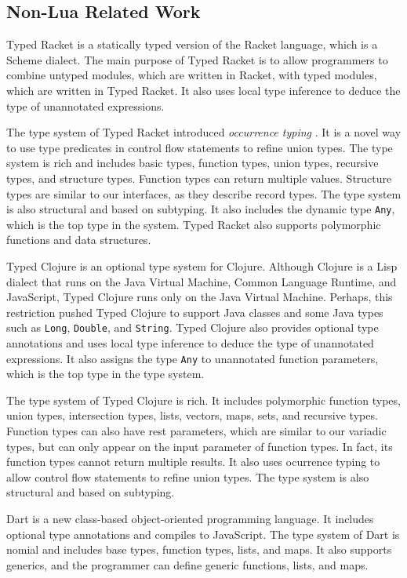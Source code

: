 \subsection{Non-Lua Related Work}

Typed Racket \citep{tobin-hochstadt2008ts} is a statically typed version
of the Racket language, which is a Scheme dialect.
The main purpose of Typed Racket is to allow programmers to combine
untyped modules, which are written in Racket, with typed modules, which are
written in Typed Racket.
It also uses local type inference to deduce the type of unannotated expressions.

The type system of Typed Racket introduced \emph{occurrence typing}
\citep{tobin-hochstadt2010ltu}.
It is a novel way to use type predicates in control flow statements
to refine union types.
The type system is rich and includes basic types, function types,
union types, recursive types, and structure types.
Function types can return multiple values.
Structure types are similar to our interfaces, as they describe
record types.
The type system is also structural and based on subtyping.
It also includes the dynamic type \texttt{Any}, which is the top
type in the system.
Typed Racket also supports polymorphic functions and data structures.

Typed Clojure \citep{bonnaire-sergeant2012typed-clojure} is an
optional type system for Clojure.
Although Clojure is a Lisp dialect that runs on the Java Virtual Machine,
Common Language Runtime, and JavaScript, Typed Clojure runs only on
the Java Virtual Machine.
Perhaps, this restriction pushed Typed Clojure to support Java classes
and some Java types such as \texttt{Long}, \texttt{Double}, and \texttt{String}.
Typed Clojure also provides optional type annotations and uses
local type inference to deduce the type of unannotated expressions.
It also assigns the type \texttt{Any} to unannotated function parameters,
which is the top type in the type system.

The type system of Typed Clojure is rich.
It includes polymorphic function types, union types, intersection types,
lists, vectors, maps, sets, and recursive types.
Function types can also have rest parameters, which are similar
to our variadic types, but can only appear on the input parameter
of function types.
In fact, its function types cannot return multiple results.
It also uses ocurrence typing to allow control flow statements to
refine union types.
The type system is also structural and based on subtyping.

Dart \citep{dart} is a new class-based object-oriented programming
language.
It includes optional type annotations and compiles to JavaScript.
The type system of Dart is nomial and includes base types,
function types, lists, and maps.
It also supports generics, and the programmer can define
generic functions, lists, and maps.

